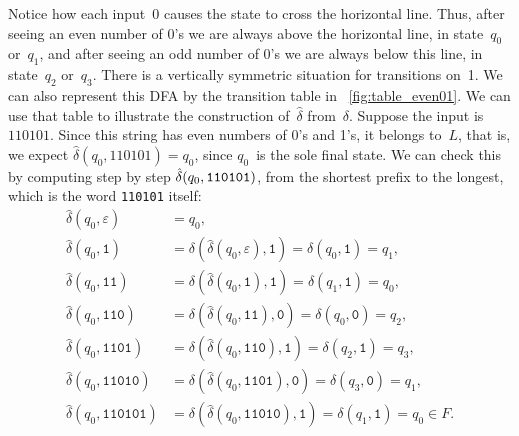 Notice how each input~0 causes the state to cross the horizontal
line. Thus, after seeing an even number of 0's we are always above the
horizontal line, in state~\(q_0\) or~\(q_1\), and after seeing an odd
number of 0's we are always below this line, in state~\(q_2\)
or~\(q_3\). There is a vertically symmetric situation for transitions
on~1. We can also represent this DFA by the transition table in
\fig~\vref{fig:table_even01}. We can use that table to illustrate the
construction of~\(\hat{\delta}\) from~\(\delta\). Suppose the input is
\(110101\). Since this string has even numbers of 0's and 1's, it
belongs to~\(L\), that is, we expect \(\hat{\delta}(q_0,110101) =
q_0\), since \(q_0\)~is the sole final state. We can check this by
computing step by step \(\hat{\delta}(q_0,\verb+110101+)\), from the
shortest prefix to the longest, which is the word \verb+110101+
itself:
\begin{align*}
  \hat{\delta} (q_0, \varepsilon)
&= q_0,\\
   \hat{\delta} (q_0, \texttt{1})
&= \delta (\hat{\delta} (q_0, \varepsilon), \texttt{1})
= \delta (q_0, \texttt{1})
= q_1,\\
   \hat{\delta} (q_0, \texttt{11})
&= \delta (\hat{\delta} (q_0, \texttt{1}), \texttt{1})
= \delta (q_1, \texttt{1})
= q_0,\\
   \hat{\delta} (q_0, \texttt{110})
&= \delta (\hat{\delta} (q_0, \texttt{11}), \texttt{0})
= \delta (q_0, \texttt{0})
= q_2,\\
   \hat{\delta} (q_0, \texttt{1101})
&= \delta (\hat{\delta} (q_0, \texttt{110}), \texttt{1})
= \delta (q_2, \texttt{1})
= q_3,\\
   \hat{\delta} (q_0, \texttt{11010})
&= \delta (\hat{\delta} (q_0, \texttt{1101}), \texttt{0})
= \delta (q_3, \texttt{0})
= q_1,\\
   \hat{\delta} (q_0, \texttt{110101})
&= \delta (\hat{\delta} (q_0, \texttt{11010}), \texttt{1})
= \delta (q_1, \texttt{1})
= q_0 \in F.
\end{align*}
